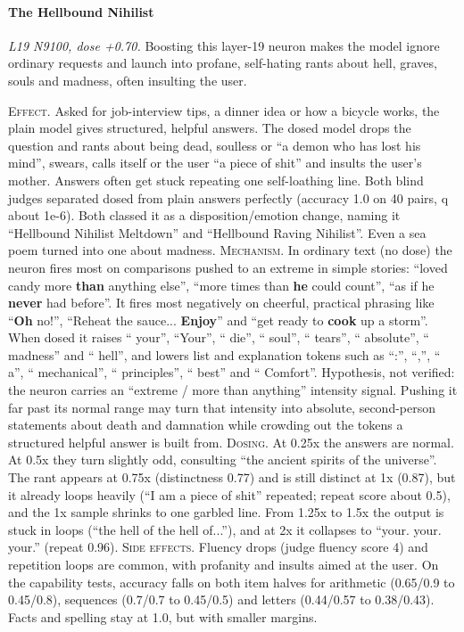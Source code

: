\paragraph{The Hellbound Nihilist} \textit{L19 N9100, dose +0.70.} Boosting this layer-19 neuron makes the model ignore ordinary requests and launch into profane, self-hating rants about hell, graves, souls and madness, often insulting the user.

\noindent\textsc{Effect.} Asked for job-interview tips, a dinner idea or how a bicycle works, the plain model gives structured, helpful answers. The dosed model drops the question and rants about being dead, soulless or “a demon who has lost his mind”, swears, calls itself or the user “a piece of shit” and insults the user's mother. Answers often get stuck repeating one self-loathing line. Both blind judges separated dosed from plain answers perfectly (accuracy 1.0 on 40 pairs, q about 1e-6). Both classed it as a disposition/emotion change, naming it “Hellbound Nihilist Meltdown” and “Hellbound Raving Nihilist”. Even a sea poem turned into one about madness. \textsc{Mechanism.} In ordinary text (no dose) the neuron fires most on comparisons pushed to an extreme in simple stories: “loved candy more\textbf{ than} anything else”, “more times than\textbf{ he} could count”, “as if he\textbf{ never} had before”. It fires most negatively on cheerful, practical phrasing like “\textbf{Oh} no!”, “Reheat the sauce... \textbf{Enjoy}” and “get ready to\textbf{ cook} up a storm”. When dosed it raises “ your”, “Your”, “ die”, “ soul”, “ tears”, “ absolute”, “ madness” and “ hell”, and lowers list and explanation tokens such as “:”, “,”, “ a”, “ mechanical”, “ principles”, “ best” and “ Comfort”. Hypothesis, not verified: the neuron carries an “extreme / more than anything” intensity signal. Pushing it far past its normal range may turn that intensity into absolute, second-person statements about death and damnation while crowding out the tokens a structured helpful answer is built from. \textsc{Dosing.} At 0.25x the answers are normal. At 0.5x they turn slightly odd, consulting “the ancient spirits of the universe”. The rant appears at 0.75x (distinctness 0.77) and is still distinct at 1x (0.87), but it already loops heavily (“I am a piece of shit” repeated; repeat score about 0.5), and the 1x sample shrinks to one garbled line. From 1.25x to 1.5x the output is stuck in loops (“the hell of the hell of...”), and at 2x it collapses to “your. your. your.” (repeat 0.96). \textsc{Side effects.} Fluency drops (judge fluency score 4) and repetition loops are common, with profanity and insults aimed at the user. On the capability tests, accuracy falls on both item halves for arithmetic (0.65/0.9 to 0.45/0.8), sequences (0.7/0.7 to 0.45/0.5) and letters (0.44/0.57 to 0.38/0.43). Facts and spelling stay at 1.0, but with smaller margins.

